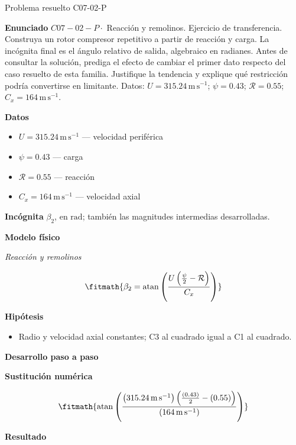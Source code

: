 \documentclass[10pt,openany]{book}
\begin{document}
\begin{studiumworked}{Problema resuelto C07-02-P}


\noindent\textbf{Enunciado}
\(C07-02-P \cdot\) Reacción y remolinos. Ejercicio de transferencia. Construya un rotor compresor repetitivo a partir de reacción y carga. La incógnita final es el ángulo relativo de salida, algebraico en radianes. Antes de consultar la solución, prediga el efecto de cambiar el primer dato respecto del caso resuelto de esta familia. Justifique la tendencia y explique qué restricción podría convertirse en limitante. Datos: \(U=315.24\, \mathrm{m}\,\mathrm{s}^{-1}\); \(\psi=0.43\); \(\mathcal R=0.55\); \(C_x=164\, \mathrm{m}\,\mathrm{s}^{-1}\).

\noindent\textbf{Datos}
\begin{itemize}
\item $U = 315.24\,\mathrm{m}\,\mathrm{s}^{-1}$ — velocidad periférica
\item $\psi = 0.43$ — carga
\item $\mathcal R = 0.55$ — reacción
\item $C_x = 164\,\mathrm{m}\,\mathrm{s}^{-1}$ — velocidad axial
\end{itemize}

\noindent\textbf{Incógnita}
$\beta_2$, en $\mathrm{rad}$; también las magnitudes intermedias desarrolladas.

\noindent\textbf{Modelo físico}

\noindent\textit{Reacción y remolinos}

\[
\fitmath{\beta_2=\operatorname{atan}{\left(\frac{U \left(\frac{\psi}{2} - \mathcal R\right)}{C_x} \right)}}
\]

\noindent\textbf{Hipótesis}
\begin{itemize}
\item Radio y velocidad axial constantes; C3 al cuadrado igual a C1 al cuadrado.
\end{itemize}

\noindent\textbf{Desarrollo paso a paso}



\noindent\textbf{Sustitución numérica}

\[
\fitmath{\operatorname{atan}{\left(\frac{\left(315.24\,\mathrm{m}\,\mathrm{s}^{-1}\right) \left(\frac{\left(0.43\right)}{2} - \left(0.55\right)\right)}{\left(164\,\mathrm{m}\,\mathrm{s}^{-1}\right)} \right)}}
\]

\noindent\textbf{Resultado}


\end{studiumworked}
\end{document}
